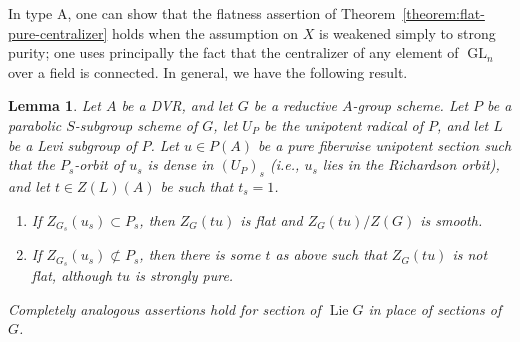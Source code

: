 \documentclass[11pt,reqno]{amsart}
\newtheorem{lemma}[theorem]{Lemma}
\theoremstyle{definition}
\DeclareMathOperator{\Ad}{Ad}
\DeclareMathOperator{\GL}{GL}
\DeclareMathOperator{\Lie}{Lie}
\begin{document}
In type A, one can show that the flatness assertion of Theorem~\ref{theorem:flat-pure-centralizer} holds when the assumption on $X$ is weakened simply to strong purity; one uses principally the fact that the centralizer of any element of $\GL_n$ over a field is connected. In general, we have the following result.

\begin{lemma}\label{corollary:flat-pure-centralizer-small-extension}
Let $A$ be a DVR, and let $G$ be a reductive $A$-group scheme. Let $P$ be a parabolic $S$-subgroup scheme of $G$, let $U_P$ be the unipotent radical of $P$, and let $L$ be a Levi subgroup of $P$. Let $u \in P(A)$ be a pure fiberwise unipotent section such that the $P_s$-orbit of $u_s$ is dense in $(U_P)_s$ (i.e., $u_s$ lies in the Richardson orbit), and let $t \in Z(L)(A)$ be such that $t_s = 1$.
\begin{enumerate}
    \item\label{item:flatness-extension-group-case} If $Z_{G_s}(u_s) \subset P_s$, then $Z_G(tu)$ is flat and $Z_G(tu)/Z(G)$ is smooth.
    \item\label{flatness-failure-group-case} If $Z_{G_s}(u_s) \not\subset P_s$, then there is some $t$ as above such that $Z_G(tu)$ is not flat, although $tu$ is strongly pure.
\end{enumerate}
Completely analogous assertions hold for section of $\Lie G$ in place of sections of $G$.
\end{lemma}
\end{document}
